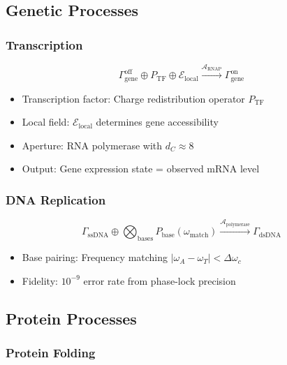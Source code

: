 \documentclass[aps,prd,twocolumn,superscriptaddress,floatfix,nofootinbib]{revtex4-2}
\theoremstyle{remark}
\newcommand{\Pop}{P}
\newcommand{\Gstate}{\Gamma}
\begin{document}
\subsection{Genetic Processes}

\subsubsection{Transcription}

\begin{equation}
\Gstate_{\text{gene}}^{\text{off}} \oplus \Pop_{\text{TF}} \oplus \mathcal{E}_{\text{local}} \xrightarrow{\mathcal{A}_{\text{RNAP}}} \Gstate_{\text{gene}}^{\text{on}}
\end{equation}

\begin{itemize}
\item Transcription factor: Charge redistribution operator $\Pop_{\text{TF}}$
\item Local field: $\mathcal{E}_{\text{local}}$ determines gene accessibility
\item Aperture: RNA polymerase with $d_C \approx 8$
\item Output: Gene expression state = observed mRNA level
\end{itemize}

\subsubsection{DNA Replication}

\begin{equation}
\Gstate_{\text{ssDNA}} \oplus \bigotimes_{\text{bases}} \Pop_{\text{base}}(\omega_{\text{match}}) \xrightarrow{\mathcal{A}_{\text{polymerase}}} \Gstate_{\text{dsDNA}}
\end{equation}

\begin{itemize}
\item Base pairing: Frequency matching $|\omega_A - \omega_T| < \Delta\omega_c$
\item Fidelity: $10^{-9}$ error rate from phase-lock precision
\end{itemize}

\subsection{Protein Processes}

\subsubsection{Protein Folding}
\end{document}
